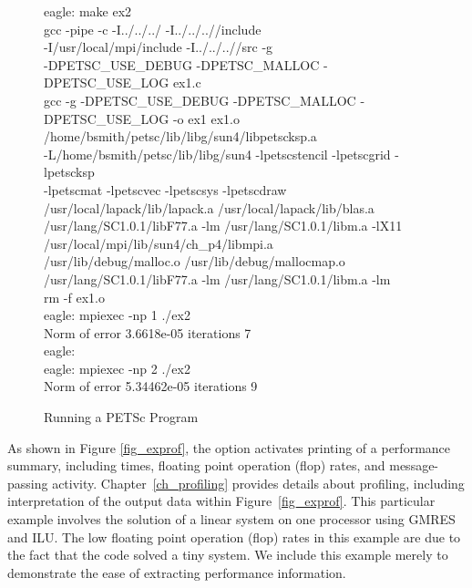 \begin{figure}[H]
{\small
\begin{tabbing}
   eagle: make ex2\\
   gcc  -pipe -c  -I../../../  -I../../..//include   \\
       -I/usr/local/mpi/include  -I../../..//src -g \\
       -DPETSC\_USE\_DEBUG -DPETSC\_MALLOC -DPETSC\_USE\_LOG ex1.c\\
   gcc -g -DPETSC\_USE\_DEBUG -DPETSC\_MALLOC -DPETSC\_USE\_LOG -o ex1 ex1.o \\
      /home/bsmith/petsc/lib/libg/sun4/libpetscksp.a \\
      -L/home/bsmith/petsc/lib/libg/sun4 -lpetscstencil -lpetscgrid  -lpetscksp \\
      -lpetscmat  -lpetscvec -lpetscsys -lpetscdraw  \\
      /usr/local/lapack/lib/lapack.a /usr/local/lapack/lib/blas.a \\
      /usr/lang/SC1.0.1/libF77.a -lm /usr/lang/SC1.0.1/libm.a -lX11 \\
      /usr/local/mpi/lib/sun4/ch\_p4/libmpi.a\\
      /usr/lib/debug/malloc.o /usr/lib/debug/mallocmap.o  \\
      /usr/lang/SC1.0.1/libF77.a -lm /usr/lang/SC1.0.1/libm.a -lm\\
   rm -f ex1.o\\
   eagle: mpiexec -np 1 ./ex2\\
   Norm of error 3.6618e-05 iterations 7\\
   eagle:\\
   eagle: mpiexec -np 2 ./ex2\\
   Norm of error 5.34462e-05 iterations 9
\end{tabbing}
}
\nobreak
\caption{Running a PETSc Program}
\label{fig_exrun}
\end{figure}

As shown in Figure \ref{fig_exprof}, the option  activates printing of a performance summary, including
times, floating point operation (flop) rates, and message-passing
activity.  Chapter~\ref{ch_profiling}
provides details about profiling, including interpretation of the
output data within Figure~\ref{fig_exprof}.  This particular example involves the solution of a linear
system on one processor using GMRES and ILU.  The low floating point
operation (flop) rates in this example are due to the fact that the
code solved a tiny system.  We include this example merely to
demonstrate the ease of extracting performance information.

